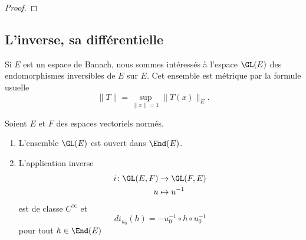 \begin{proof}
%
%
\end{proof}

\subsection{L'inverse, sa différentielle}

Si \( E\) est un espace de Banach, nous sommes intéressés à l'espace \( \GL(E)\) des endomorphismes inversibles de \( E\) sur \( E\). Cet ensemble est métrique par la formule usuelle
\begin{equation}
    \| T \|=\sup_{\| x \|=1}\| T(x) \|_E.
\end{equation}

\begin{theorem}    \label{ThoCINVBTJ}
    Soient \( E\) et \( F\) des espaces vectoriels normés.
    \begin{enumerate}
        \item
        L'ensemble \( \GL(E)\) est ouvert dans \( \End(E)\).
    \item
        L'application inverse
    \begin{equation}
        \begin{aligned}
        i\colon \GL(E,F)&\to \GL(F,E) \\
        u&\mapsto u^{-1} 
        \end{aligned}
    \end{equation}
    est de classe \( C^{\infty}\) et
    \begin{equation}
        di_{u_0}(h)=-u_0^{-1}\circ h\circ u_0^{-1}
    \end{equation}
    pour tout \( h\in\End(E)\)
    \end{enumerate}
\end{theorem}

